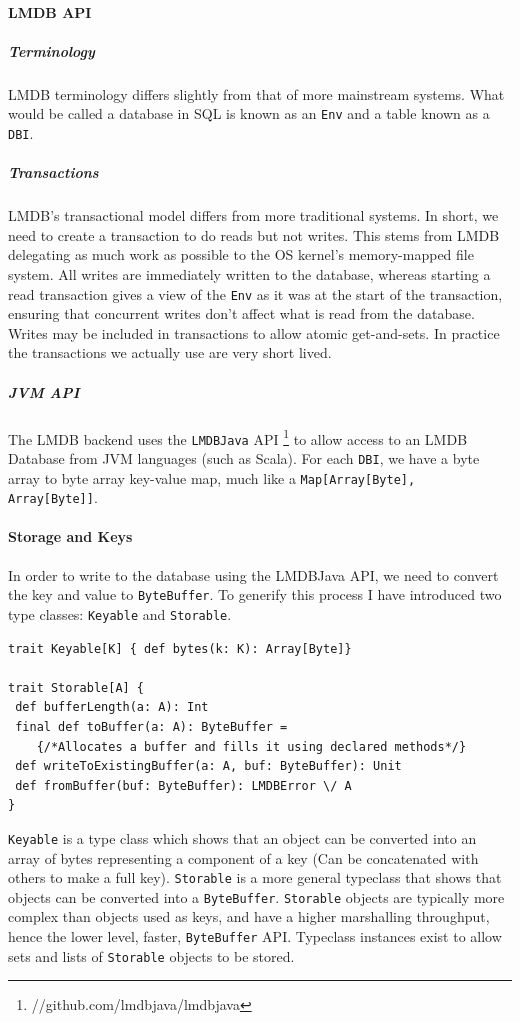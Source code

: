 \documentclass[12pt,a4paper,twoside,openright]{report}
\newcommand\codeName[1]{\texttt{#1}}
\newcommand\term[1]{\texttt{#1}}
\renewcommand{\baselinestretch}{1.1}    %
\begin{document}
		\paragraph{LMDB API}
			\subparagraph{Terminology}
			LMDB terminology differs slightly from that of more mainstream systems. What would be called a database in SQL is known as an \term{Env} and a table known as a \term{DBI}.
			\subparagraph{Transactions}
				LMDB's transactional model differs from more traditional systems. In short, we need to create a transaction to do reads but not writes. This stems from LMDB delegating as much work as possible to the OS kernel's memory-mapped file system. All writes are immediately written to the database, whereas starting a read transaction gives a view of the \term{Env} as it was at the start of  the transaction, ensuring that concurrent writes don't affect what is read from the database. Writes may be included in transactions to allow atomic get-and-sets. In practice the transactions we actually use are very short lived.
			\subparagraph{JVM API}
			The LMDB backend uses the \codeName{LMDBJava} API \footnote{//github.com/lmdbjava/lmdbjava} to allow access to an LMDB Database from JVM languages (such as Scala). For each \term{DBI}, we have a byte array to byte array key-value map, much like a \codeName{Map[Array[Byte], Array[Byte]]}.
			
		\paragraph{Storage and Keys}
			In order to write to the database using the LMDBJava API, we need to convert the key and value to \codeName{ByteBuffer}. To generify this process I have introduced two type classes: \codeName{Keyable} and \codeName{Storable}.
			
\renewcommand{\baselinestretch}{0.8}
\begin{framed}
\begin{verbatim}
trait Keyable[K] { def bytes(k: K): Array[Byte]}

trait Storable[A] {
 def bufferLength(a: A): Int
 final def toBuffer(a: A): ByteBuffer = 
    {/*Allocates a buffer and fills it using declared methods*/}
 def writeToExistingBuffer(a: A, buf: ByteBuffer): Unit
 def fromBuffer(buf: ByteBuffer): LMDBError \/ A
}
\end{verbatim}
\end{framed}	
\renewcommand{\baselinestretch}{1.1}
		
\codeName{Keyable} is a type class which shows that an object can be converted into an array of bytes representing a component of a key (Can be concatenated with others to make a full key). \codeName{Storable} is a more general typeclass that shows that objects can be converted into a \codeName{ByteBuffer}. \codeName{Storable} objects are typically more complex than objects used as keys, and have a higher marshalling throughput, hence the lower level, faster, \codeName{ByteBuffer} API. Typeclass instances exist to allow sets and lists of \codeName{Storable} objects to be stored.	
			
\end{document}

